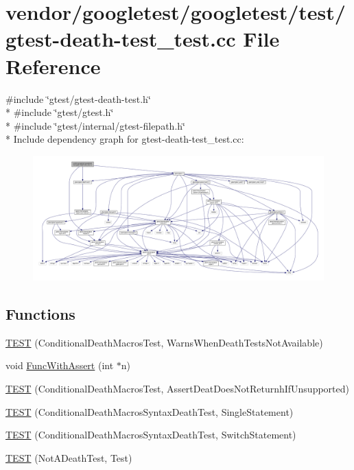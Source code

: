 \hypertarget{gtest-death-test__test_8cc}{}\section{vendor/googletest/googletest/test/gtest-\/death-\/test\+\_\+test.cc File Reference}
\label{gtest-death-test__test_8cc}
{\ttfamily \#include \char`\"{}gtest/gtest-\/death-\/test.\+h\char`\"{}}\\*
{\ttfamily \#include \char`\"{}gtest/gtest.\+h\char`\"{}}\\*
{\ttfamily \#include \char`\"{}gtest/internal/gtest-\/filepath.\+h\char`\"{}}\\*
Include dependency graph for gtest-\/death-\/test\+\_\+test.cc\+:\nopagebreak
\begin{figure}[H]
\begin{center}
\leavevmode
\includegraphics[width=350pt]{gtest-death-test__test_8cc__incl}
\end{center}
\end{figure}
\subsection*{Functions}
\begin{DoxyCompactItemize}
\item 
\hyperlink{gtest-death-test__test_8cc_a8a47cdbd11c2456db464fe098d134aa0}{T\+E\+ST} (Conditional\+Death\+Macros\+Test, Warns\+When\+Death\+Tests\+Not\+Available)
\item 
void \hyperlink{gtest-death-test__test_8cc_afe40addf0e0bb4657d18f512092ef03b}{Func\+With\+Assert} (int $\ast$n)
\item 
\hyperlink{gtest-death-test__test_8cc_acdbff3626995270fcbcc0b97e303d742}{T\+E\+ST} (Conditional\+Death\+Macros\+Test, Assert\+Deat\+Does\+Not\+Returnh\+If\+Unsupported)
\item 
\hyperlink{gtest-death-test__test_8cc_aacb04a80e0263de84b203b95cc421437}{T\+E\+ST} (Conditional\+Death\+Macros\+Syntax\+Death\+Test, Single\+Statement)
\item 
\hyperlink{gtest-death-test__test_8cc_a8d27f7b1efa4db83935274467e17f40c}{T\+E\+ST} (Conditional\+Death\+Macros\+Syntax\+Death\+Test, Switch\+Statement)
\item 
\hyperlink{gtest-death-test__test_8cc_af77aa369d8ed7d7ceefda4e7b073b05a}{T\+E\+ST} (Not\+A\+Death\+Test, Test)
\end{DoxyCompactItemize}


